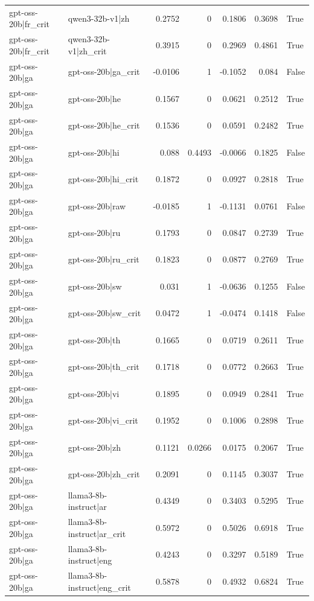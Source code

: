 \begin{table}
\begin{tabular}{l l r r r r l}
gpt-oss-20b|fr_crit & qwen3-32b-v1|zh & 0.2752 & 0 & 0.1806 & 0.3698 & True \\
gpt-oss-20b|fr_crit & qwen3-32b-v1|zh_crit & 0.3915 & 0 & 0.2969 & 0.4861 & True \\
gpt-oss-20b|ga & gpt-oss-20b|ga_crit & -0.0106 & 1 & -0.1052 & 0.084 & False \\
gpt-oss-20b|ga & gpt-oss-20b|he & 0.1567 & 0 & 0.0621 & 0.2512 & True \\
gpt-oss-20b|ga & gpt-oss-20b|he_crit & 0.1536 & 0 & 0.0591 & 0.2482 & True \\
gpt-oss-20b|ga & gpt-oss-20b|hi & 0.088 & 0.4493 & -0.0066 & 0.1825 & False \\
gpt-oss-20b|ga & gpt-oss-20b|hi_crit & 0.1872 & 0 & 0.0927 & 0.2818 & True \\
gpt-oss-20b|ga & gpt-oss-20b|raw & -0.0185 & 1 & -0.1131 & 0.0761 & False \\
gpt-oss-20b|ga & gpt-oss-20b|ru & 0.1793 & 0 & 0.0847 & 0.2739 & True \\
gpt-oss-20b|ga & gpt-oss-20b|ru_crit & 0.1823 & 0 & 0.0877 & 0.2769 & True \\
gpt-oss-20b|ga & gpt-oss-20b|sw & 0.031 & 1 & -0.0636 & 0.1255 & False \\
gpt-oss-20b|ga & gpt-oss-20b|sw_crit & 0.0472 & 1 & -0.0474 & 0.1418 & False \\
gpt-oss-20b|ga & gpt-oss-20b|th & 0.1665 & 0 & 0.0719 & 0.2611 & True \\
gpt-oss-20b|ga & gpt-oss-20b|th_crit & 0.1718 & 0 & 0.0772 & 0.2663 & True \\
gpt-oss-20b|ga & gpt-oss-20b|vi & 0.1895 & 0 & 0.0949 & 0.2841 & True \\
gpt-oss-20b|ga & gpt-oss-20b|vi_crit & 0.1952 & 0 & 0.1006 & 0.2898 & True \\
gpt-oss-20b|ga & gpt-oss-20b|zh & 0.1121 & 0.0266 & 0.0175 & 0.2067 & True \\
gpt-oss-20b|ga & gpt-oss-20b|zh_crit & 0.2091 & 0 & 0.1145 & 0.3037 & True \\
gpt-oss-20b|ga & llama3-8b-instruct|ar & 0.4349 & 0 & 0.3403 & 0.5295 & True \\
gpt-oss-20b|ga & llama3-8b-instruct|ar_crit & 0.5972 & 0 & 0.5026 & 0.6918 & True \\
gpt-oss-20b|ga & llama3-8b-instruct|eng & 0.4243 & 0 & 0.3297 & 0.5189 & True \\
gpt-oss-20b|ga & llama3-8b-instruct|eng_crit & 0.5878 & 0 & 0.4932 & 0.6824 & True \\

\end{tabular}
\end{table}
